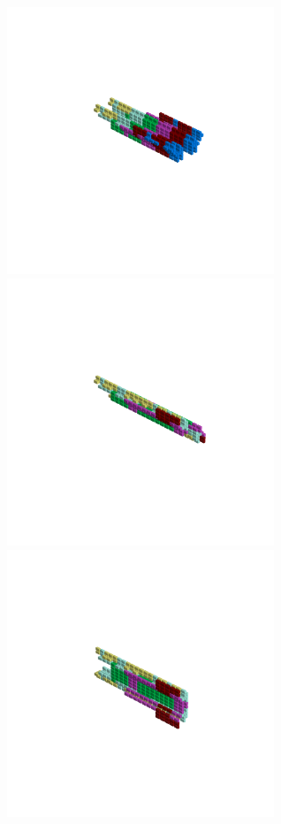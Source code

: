 \begin{minipage}[b]{0.50\linewidth}                                       
  \begin{figure}[H]
      \centering
        \vspace*{-1cm}
        \hspace*{-2cm}
        \includegraphics[width=8cm]{src/symmetries/pattern11_1-45.png}%
        \hspace*{-4cm}
        \includegraphics[width=8cm]{src/symmetries/pattern11_2-45.png}\\
        \vspace*{-5cm}
        \hspace*{-1cm}
        \includegraphics[width=8cm]{src/symmetries/pattern11_3-45.png}\\

\end{figure}
\end{minipage}
